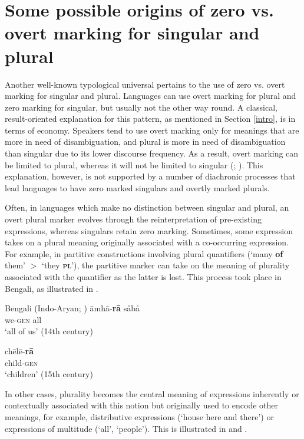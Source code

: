 \documentclass[output=paper]{langsci/langscibook}
\begin{document}
\section{Some possible origins of zero vs. overt marking for singular
  and plural}\label{number}
Another well-known typological
universal pertains to the use of zero vs. overt
marking for singular and plural. Languages can use overt marking for plural and zero marking for
  singular, but usually not the other way round. A classical,
  result-oriented explanation for this pattern, as
  mentioned in Section \ref{intro},  is in terms of economy. Speakers tend to use overt marking
  only for meanings that are more in need of disambiguation, and plural is more in need of disambiguation than singular due to its
  lower discourse frequency. As a result, overt marking can be limited
  to plural, whereas it will not be limited to singular (\citealt{Greenberg1966,TU2};
  \citealt{Haspelmath2008}).  This explanation, however, is not
supported by a number of diachronic processes that lead languages to
have zero marked singulars and overtly marked plurals.


Often, in languages which make no distinction between singular
and plural, an overt plural marker  evolves through the reinterpretation of
pre-existing expressions, whereas
    singulars retain zero marking. Sometimes, some expression  takes on a plural meaning originally associated with
      a co-occurring expression. For example, in partitive
      constructions involving plural quantifiers (`many
      {\bf of} them' $>$ `they  {\bf \textsc{pl}}'), the partitive marker can take on the meaning of
      plurality associated with the quantifier as the latter is
      lost. This process took place in  Bengali, as illustrated in .



\ea\label{bengali}
Bengali (Indo-Aryan; )
\ea
\gll āmhā-\textbf{{rā}} s{\r{a}}b{\r{a}}\\
we-\textsc{gen} all\\
\glt `all of us' (14th century)


\ex
\gll chēlē-\textbf{{rā}} \\
child-\textsc{gen}\\
\glt `children' (15th century)

\z
\z


In other cases, plurality becomes the central meaning of expressions
inherently or contextually
associated with this notion but originally used to encode other meanings, for example, distributive expressions
(`house here and there') or expressions of multitude (`all', `people'). This is illustrated in  and .
\end{document}
